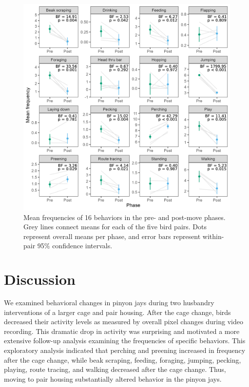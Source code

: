 \documentclass[
  pub]{apa6}
\begin{document}
\begin{figure}

{\centering \includegraphics[width=1\linewidth]{figures/behavior_freq_phase} 

}

\caption{Mean frequencies of 16 behaviors in the pre- and post-move phases. Grey lines connect means for each of the five bird pairs. Dots represent overall means per phase, and error bars represent within-pair 95\% confidence intervals.}\label{fig:behavior-fig}
\end{figure}

\hypertarget{discussion}{%
\section{Discussion}\label{discussion}}

We examined behavioral changes in pinyon jays during two husbandry interventions of a larger cage and pair housing. After the cage change, birds decreased their activity levels as measured by overall pixel changes during video recording. This dramatic drop in activity was surprising and motivated a more extensive follow-up analysis examining the frequencies of specific behaviors. This exploratory analysis indicated that perching and preening increased in frequency after the cage change, while beak scraping, feeding, foraging, jumping, pecking, playing, route tracing, and walking decreased after the cage change. Thus, moving to pair housing substantially altered behavior in the pinyon jays.
\end{document}
